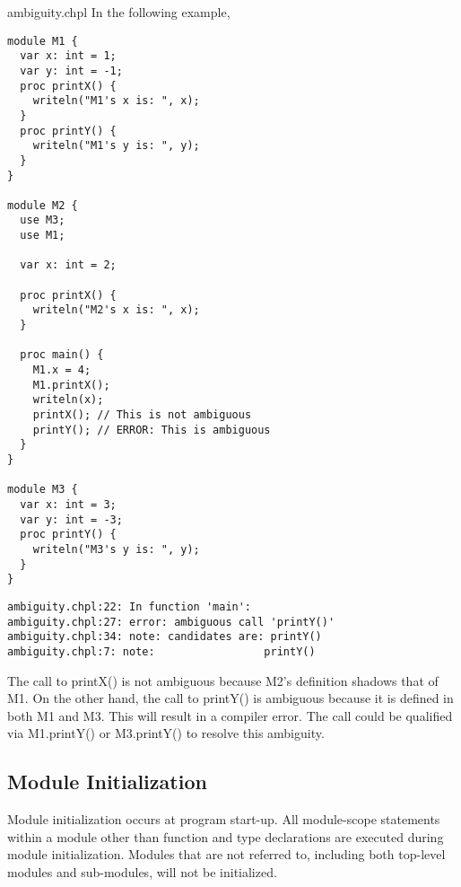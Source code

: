 \begin{chapelexample}{ambiguity.chpl}
In the following example,
\begin{chapel}
\begin{verbatim}
module M1 {
  var x: int = 1;
  var y: int = -1;
  proc printX() {
    writeln("M1's x is: ", x);
  }
  proc printY() {
    writeln("M1's y is: ", y);
  }
}
 
module M2 {
  use M3;
  use M1;

  var x: int = 2;

  proc printX() {
    writeln("M2's x is: ", x);
  }

  proc main() {
    M1.x = 4;
    M1.printX();
    writeln(x);
    printX(); // This is not ambiguous
    printY(); // ERROR: This is ambiguous
  }
}

module M3 {
  var x: int = 3;
  var y: int = -3;
  proc printY() {
    writeln("M3's y is: ", y);
  }
}
\end{verbatim}
\end{chapel}
\begin{chapeloutput}
\begin{verbatim}
ambiguity.chpl:22: In function 'main':
ambiguity.chpl:27: error: ambiguous call 'printY()'
ambiguity.chpl:34: note: candidates are: printY()
ambiguity.chpl:7: note:                 printY()
\end{verbatim}
\end{chapeloutput}
The call to printX() is not ambiguous because M2's definition shadows
that of M1.  On the other hand, the call to printY() is ambiguous
because it is defined in both M1 and M3.  This will result in a
compiler error.  The call could be qualified via M1.printY() or M3.printY()
to resolve this ambiguity.
\end{chapelexample}

\subsection{Module Initialization}
\label{Module_Initialization}

Module initialization occurs at program start-up.  All module-scope
statements within a module other than function and type declarations are
executed during module initialization. Modules that are not referred to,
including both top-level modules and sub-modules, will not be initialized.

